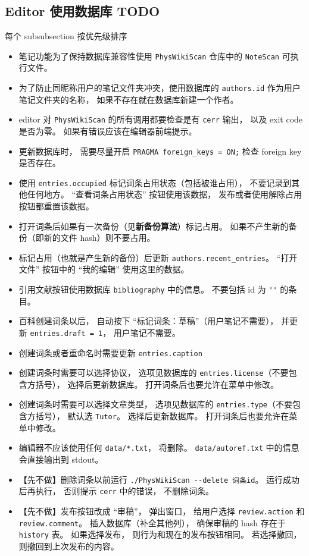 
\subsection{Editor 使用数据库 TODO}
每个 subsubsection 按优先级排序

\begin{itemize}
\item 笔记功能为了保持数据库兼容性使用 \verb|PhysWikiScan| 仓库中的 \verb|NoteScan| 可执行文件。
\item 为了防止同昵称用户的笔记文件夹冲突，使用数据库的 \verb|authors.id| 作为用户笔记文件夹的名称， 如果不存在就在数据库新建一个作者。
\item editor 对 \verb|PhysWikiScan| 的所有调用都要检查是有 \verb|cerr| 输出， 以及 exit code 是否为零。 如果有错误应该在编辑器前端提示。
\item 更新数据库时， 需要尽量开启 \verb|PRAGMA foreign_keys = ON;| 检查 foreign key 是否存在。
\item 使用 \verb|entries.occupied| 标记词条占用状态（包括被谁占用）， 不要记录到其他任何地方。 “查看词条占用状态” 按钮使用该数据， 发布或者使用解除占用按钮都重置该数据。
\item 打开词条后如果有一次备份（见\textbf{新备份算法}）标记占用。 如果不产生新的备份（即新的文件 hash）则不要占用。
\item 标记占用（也就是产生新的备份）后更新 \verb|authors.recent_entries|。 “打开文件” 按钮中的 “我的编辑” 使用这里的数据。
\item 引用文献按钮使用数据库 \verb|bibliography| 中的信息。 不要包括 id 为 \verb|''| 的条目。
\item 百科创建词条以后， 自动按下 “标记词条：草稿”（用户笔记不需要）， 并更新 \verb|entries.draft = 1|， 用户笔记不需要。
\item 创建词条或者重命名时需要更新 \verb|entries.caption|
\item 创建词条时需要可以选择协议， 选项见数据库的 \verb|entries.license|（不要包含方括号）， 选择后更新数据库。 打开词条后也要允许在菜单中修改。
\item 创建词条时需要可以选择文章类型， 选项见数据库的 \verb|entries.type|（不要包含方括号）， 默认选 \verb|Tutor|。 选择后更新数据库。 打开词条后也要允许在菜单中修改。
\item 编辑器不应该使用任何 \verb|data/*.txt|， 将删除。 \verb|data/autoref.txt| 中的信息会直接输出到 stdout。


\item 【先不做】删除词条以前运行 \verb|./PhysWikiScan --delete 词条id|。 运行成功后再执行， 否则提示 \verb`cerr` 中的错误， 不删除词条。
\item 【先不做】发布按钮改成 “审稿”， 弹出窗口， 给用户选择 \verb|review.action| 和 \verb|review.comment|。 插入数据库（补全其他列）， 确保审稿的 hash 存在于 \verb|history| 表。 如果选择发布， 则行为和现在的发布按钮相同。 若选择撤回， 则撤回到上次发布的内容。
\end{itemize}


